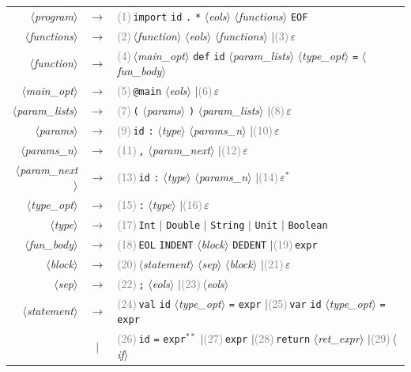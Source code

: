 
\providecommand{\T}[1]{\texttt{#1}}
\providecommand{\nt}[1]{$\langle$\textit{#1}$\rangle$}
\providecommand{\rn}[1]{\textcolor{gray}{\scriptsize(#1)}\,}
\providecommand{\alt}{\enspace$|$\enspace}
\begin{longtable}{@{}r@{\hspace{0.5em}}c@{\hspace{0.5em}}p{12.2cm}@{}}
\nt{program}     & $\rightarrow$ & \rn{1}\T{import} \T{id} \T{.} \T{*} \nt{eols} \nt{functions} \T{EOF} \\
\nt{functions}   & $\rightarrow$ & \rn{2}\nt{function} \nt{eols} \nt{functions} \alt \rn{3}$\varepsilon$ \\
\nt{function}    & $\rightarrow$ & \rn{4}\nt{main\_opt} \T{def} \T{id} \nt{param\_lists} \nt{type\_opt} \T{=} \nt{fun\_body} \\
\nt{main\_opt}   & $\rightarrow$ & \rn{5}\T{@main} \nt{eols} \alt \rn{6}$\varepsilon$ \\[4pt]
\nt{param\_lists}& $\rightarrow$ & \rn{7}\T{(} \nt{params} \T{)} \nt{param\_lists} \alt \rn{8}$\varepsilon$ \\
\nt{params}      & $\rightarrow$ & \rn{9}\T{id} \T{:} \nt{type} \nt{params\_n} \alt \rn{10}$\varepsilon$ \\
\nt{params\_n}   & $\rightarrow$ & \rn{11}\T{,} \nt{param\_next} \alt \rn{12}$\varepsilon$ \\
\nt{param\_next} & $\rightarrow$ & \rn{13}\T{id} \T{:} \nt{type} \nt{params\_n} \alt \rn{14}$\varepsilon^{*}$ \\
\nt{type\_opt}   & $\rightarrow$ & \rn{15}\T{:} \nt{type} \alt \rn{16}$\varepsilon$ \\
\nt{type}        & $\rightarrow$ & \rn{17}\T{Int} $|$ \T{Double} $|$ \T{String} $|$ \T{Unit} $|$ \T{Boolean} \\[4pt]
\nt{fun\_body}   & $\rightarrow$ & \rn{18}\T{EOL} \T{INDENT} \nt{block} \T{DEDENT} \alt \rn{19}\T{expr} \\
\nt{block}       & $\rightarrow$ & \rn{20}\nt{statement} \nt{sep} \nt{block} \alt \rn{21}$\varepsilon$ \\
\nt{sep}         & $\rightarrow$ & \rn{22}\T{;} \nt{eols} \alt \rn{23}\nt{eols} \\
\nt{statement}   & $\rightarrow$ & \rn{24}\T{val} \T{id} \nt{type\_opt} \T{=} \T{expr}
                                   \alt \rn{25}\T{var} \T{id} \nt{type\_opt} \T{=} \T{expr} \\
                 & $|$           & \rn{26}\T{id} \T{=} \T{expr}$^{**}$ \alt \rn{27}\T{expr}
                                   \alt \rn{28}\T{return} \nt{ret\_expr} \alt \rn{29}\nt{if} \\

\end{longtable}
